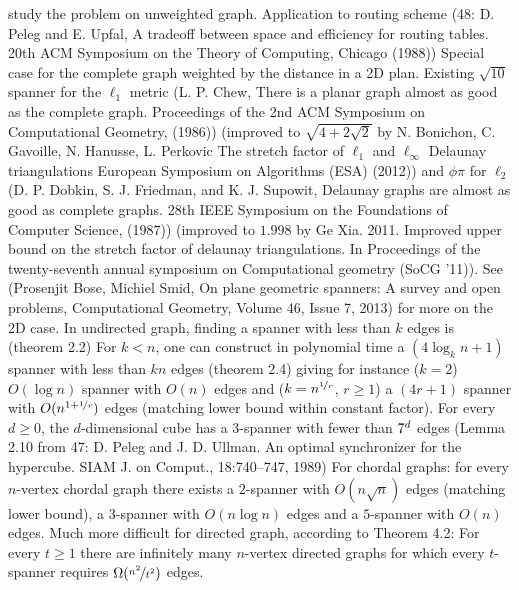 study the problem on unweighted graph. Application to routing scheme (48: D. Peleg and E. Upfal, A
tradeoff between space and efficiency for routing tables. 20th ACM Symposium on the Theory of
Computing, Chicago (1988))
Special case for the complete graph weighted by the distance in a 2D plan. Existing $\sqrt{10}$
spanner for the $\ell_1$ metric (L. P. Chew, There is a planar graph almost as good as the complete
graph.  Proceedings of the 2nd ACM Symposium on Computational Geometry, (1986)) (improved to
$\sqrt{4+2\sqrt{2}}$ by N. Bonichon, C. Gavoille, N. Hanusse, L. Perkovic The stretch factor of
$\ell_1$ and $\ell_{\infty}$ Delaunay triangulations European Symposium on Algorithms (ESA) (2012))
and $\phi \pi$ for $\ell_2$ (D. P. Dobkin, S. J. Friedman, and K. J. Supowit, Delaunay graphs are
almost as good as complete graphs. 28th IEEE Symposium on the Foundations of Computer Science,
(1987)) (improved to $1.998$ by Ge Xia. 2011. Improved upper bound on the stretch factor of delaunay
triangulations. In Proceedings of the twenty-seventh annual symposium on Computational geometry
(SoCG '11)). See (Prosenjit Bose, Michiel Smid, On plane geometric spanners: A survey and open
problems, Computational Geometry, Volume 46, Issue 7, 2013) for more on the 2D case.
In undirected graph, finding a spanner with less than $k$ edges is \NPc{} (theorem 2.2)
For $k<n$, one can construct in polynomial time a $(4\log_k n +1)$ spanner with less than $kn$ edges
(theorem 2.4) giving for instance ($k=2$) $O(\log n)$ spanner with $O(n)$ edges and
($k=n^{\nicefrac{1}{r}}$, $r\geq 1$) a $(4r+1)$ spanner with $O(n^{1+\nicefrac{1}{r}})$ edges
(matching lower bound within constant factor). For every $d \geq 0$, the $d$-dimensional cube has a
$3$-spanner with fewer than $7\time 2^d$ edges (Lemma 2.10 from 47: D. Peleg and J. D. Ullman. An
optimal synchronizer for the hypercube. SIAM J. on Comput., 18:740–747, 1989)
For chordal graphs: for every $n$-vertex chordal graph there exists a $2$-spanner with
$O(n\sqrt{n})$ edges (matching lower bound), a $3$-spanner with $O(n \log n)$ edges and a $5$-spanner
with $O(n)$ edges.
Much more difficult for directed graph, according to Theorem 4.2: For every $t \geq 1$ there are
infinitely many $n$-vertex directed graphs for which every $t$-spanner requires
$\Omega(\nicefrac{n^2}{t^2})$ edges.


